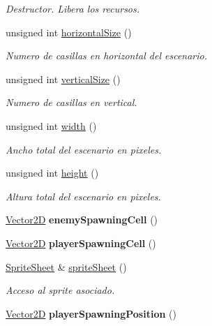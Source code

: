 \begin{DoxyCompactItemize}
\begin{DoxyCompactList}\small\item\em Destructor. Libera los recursos. \end{DoxyCompactList}\item 
unsigned int \hyperlink{class_scenario_a457b1626f68e6a2659aaf6a2038c7aa1}{horizontal\-Size} ()
\begin{DoxyCompactList}\small\item\em Numero de casillas en horizontal del escenario. \end{DoxyCompactList}\item 
unsigned int \hyperlink{class_scenario_a210693b48fbbc4b02ebc4824131ea0ad}{vertical\-Size} ()
\begin{DoxyCompactList}\small\item\em Numero de casillas en vertical. \end{DoxyCompactList}\item 
unsigned int \hyperlink{class_scenario_a2b098ae8cf7bfdbf9d281d72e241bb88}{width} ()
\begin{DoxyCompactList}\small\item\em Ancho total del escenario en pixeles. \end{DoxyCompactList}\item 
unsigned int \hyperlink{class_scenario_ad46654c66f78b69b2ceff9fbed9fd31d}{height} ()
\begin{DoxyCompactList}\small\item\em Altura total del escenario en pixeles. \end{DoxyCompactList}\item 
\hypertarget{class_scenario_a5c42393e886cffc17d929d518dfec392}{\hyperlink{class_vector2_d}{Vector2\-D} {\bfseries enemy\-Spawning\-Cell} ()}\label{class_scenario_a5c42393e886cffc17d929d518dfec392}

\item 
\hypertarget{class_scenario_a867a2986faf6ab2b027d783edc0d9a00}{\hyperlink{class_vector2_d}{Vector2\-D} {\bfseries player\-Spawning\-Cell} ()}\label{class_scenario_a867a2986faf6ab2b027d783edc0d9a00}

\item 
\hyperlink{class_sprite_sheet}{Sprite\-Sheet} \& \hyperlink{class_scenario_a823adba186e44615fcb34990713d9d4c}{sprite\-Sheet} ()
\begin{DoxyCompactList}\small\item\em Acceso al sprite asociado. \end{DoxyCompactList}\item 
\hypertarget{class_scenario_a95e4e91a8989095a0aff9eccdc4b2180}{\hyperlink{class_vector2_d}{Vector2\-D} {\bfseries player\-Spawning\-Position} ()}\label{class_scenario_a95e4e91a8989095a0aff9eccdc4b2180}


\end{DoxyCompactItemize}
